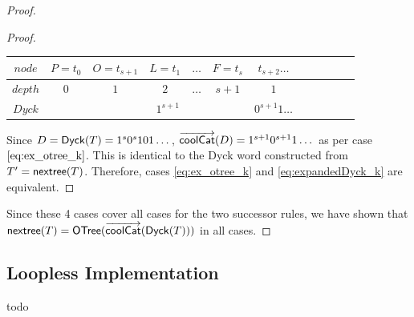 \begin{proof}
\begin{proof}
\begin{center}
\begin{tabular}{ |c|c|c|c|c|c|c|c|c|c|c|c| }
	    $node$ & $P=t_0$ & $O=t_{s+1}$& $L=t_1$ & $\dots$ & $F=t_s$  & $t_{s+2}\dots$ \\
	    \hline
	    $depth$ & $0$ & $1$ & $2$ & $\dots$ & $s+1$ & $1$  \\
	    \hline
	    $Dyck$ &  &  \multicolumn{4}{|c|}{$1^{s+1}$} &  $0^{s+1}1\dots$   \\
	    \hline
	\end{tabular}
    \end{center}

Since $D=\mathsf{Dyck}{(T)}=1^s0^s101\dots$, $\overrightarrow{\mathsf{coolCat}}{(D)}=1^{s+1}0^{s+1}1\dots$ as per case $\ref{eq:ex_otree_k}$.  This is identical to the Dyck word constructed from $T'=\mathsf{nextree}{(T)}$.  Therefore, cases \ref{eq:ex_otree_k} and \ref{eq:expandedDyck_k} are equivalent.

\end{proof}

Since these 4 cases cover all cases for the two successor rules, we have shown that $\mathsf{nextree}{(T)}=\mathsf{OTree}{(\overrightarrow{\mathsf{coolCat}}{(\mathsf{Dyck}{(T)})})}$ in all cases. 
\end{proof}
\subsection{Loopless Implementation}
todo
